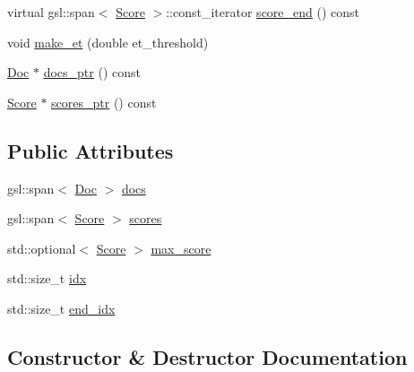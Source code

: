 \begin{DoxyCompactItemize}
\item 
virtual gsl\+::span$<$ \hyperlink{structbloodhound_1_1Score}{Score} $>$\+::const\+\_\+iterator \hyperlink{classbloodhound_1_1PostingList_ae89abf9882f73f35a6e106c5a328ca6f}{score\+\_\+end} () const
\item 
void \hyperlink{classbloodhound_1_1PostingList_a3c9d6c5e88a7aae2642ff1d0f52160c0}{make\+\_\+et} (double et\+\_\+threshold)
\item 
\hyperlink{structbloodhound_1_1Doc}{Doc} $\ast$ \hyperlink{classbloodhound_1_1PostingList_acfca9e8ad1fd94461b56390fdd60779f}{docs\+\_\+ptr} () const
\item 
\hyperlink{structbloodhound_1_1Score}{Score} $\ast$ \hyperlink{classbloodhound_1_1PostingList_a79be9c874bb91e17ca308ae0528e9277}{scores\+\_\+ptr} () const
\end{DoxyCompactItemize}
\subsection*{Public Attributes}
\begin{DoxyCompactItemize}
\item 
gsl\+::span$<$ \hyperlink{structbloodhound_1_1Doc}{Doc} $>$ \hyperlink{classbloodhound_1_1PostingList_a11749c12634d86c73b7d9c150acaac03}{docs}
\item 
gsl\+::span$<$ \hyperlink{structbloodhound_1_1Score}{Score} $>$ \hyperlink{classbloodhound_1_1PostingList_a2c773bffa3d78d2e7a7e04d918b064da}{scores}
\item 
std\+::optional$<$ \hyperlink{structbloodhound_1_1Score}{Score} $>$ \hyperlink{classbloodhound_1_1PostingList_acf53d7e16fd974982801783dce7127d4}{max\+\_\+score}
\item 
std\+::size\+\_\+t \hyperlink{classbloodhound_1_1PostingList_a9aa9a9d1db46c6858fa952a36e1bf8fa}{idx}
\item 
std\+::size\+\_\+t \hyperlink{classbloodhound_1_1PostingList_a7c4d53dfa824951670d68ef57cd2068d}{end\+\_\+idx}
\end{DoxyCompactItemize}


\subsection{Constructor \& Destructor Documentation}
\mbox{\label{classbloodhound_1_1PostingList_aec7755e1f3b276b65f474fb1d85620a7}} 
